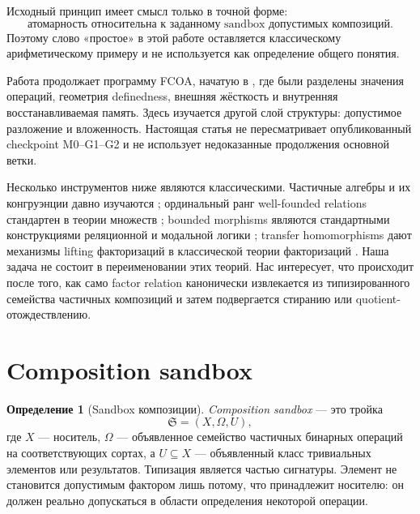 \documentclass[11pt]{article}
\theoremstyle{definition}
\newtheorem{definition}[theorem]{Определение}
\theoremstyle{remark}
\newcommand{\Sbx}{\mathfrak S}
\begin{document}
Исходный принцип имеет смысл только в точной форме:
\begin{equation}
\boxed{\text{атомарность относительна к заданному sandbox допустимых композиций}.}
\label{eq:thesis}
\end{equation}
Поэтому слово «простое» в этой работе оставляется классическому арифметическому примеру и не используется как определение общего понятия.

Работа продолжает программу FCOA, начатую в \cite{MalachevskyFCOA2026}, где были разделены значения операций, геометрия definedness, внешняя жёсткость и внутренняя восстанавливаемая память. Здесь изучается другой слой структуры: допустимое разложение и вложенность. Настоящая статья не пересматривает опубликованный checkpoint M0--G1--G2 и не использует недоказанные продолжения основной ветки.

Несколько инструментов ниже являются классическими. Частичные алгебры и их конгруэнции давно изучаются \cite{Gratzer1979,GratzerWenzel1967}; ординальный ранг well-founded relations стандартен в теории множеств \cite{Jech2003}; bounded morphisms являются стандартными конструкциями реляционной и модальной логики \cite{BlackburnDeRijkeVenema2001}; transfer homomorphisms дают механизмы lifting факторизаций в классической теории факторизаций \cite{GeroldingerHalterKoch2006}. Наша задача не состоит в переименовании этих теорий. Нас интересует, что происходит после того, как само factor relation канонически извлекается из типизированного семейства частичных композиций и затем подвергается стиранию или quotient-отождествлению.

\section{Composition sandbox}

\begin{definition}[Sandbox композиции]
\emph{Composition sandbox} — это тройка
\begin{equation}
\Sbx=(X,\Omega,U),
\label{eq:sandbox}
\end{equation}
где \(X\) — носитель, \(\Omega\) — объявленное семейство частичных бинарных операций на соответствующих сортах, а \(U\subseteq X\) — объявленный класс тривиальных элементов или результатов. Типизация является частью сигнатуры. Элемент не становится допустимым фактором лишь потому, что принадлежит носителю: он должен реально допускаться в области определения некоторой операции.
\end{definition}
\end{document}
